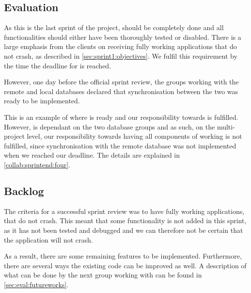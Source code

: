 \subsection{Evaluation}

As this is the last sprint of the project, \launcher should be completely done and all functionalities should either have been thoroughly tested or disabled.
There is a large emphasis from the clients on receiving  fully working applications that do not crash, as described in \cref{sec:sprint1:objectives}.
We fulfil this requirement by the time the deadline for \launcher is reached.

However, one day before the official sprint review, the groups working with the remote and local databases declared that synchronisation between the two was ready to be implemented.

This is an example of where \launcher is ready and our responsibility towards \launcher is fulfilled.
However, \launcher is dependant on the two database groups and as such, on the multi-project level, our responsibility towards having all components of \launcher working is not fulfilled, since synchronisation with the remote database was not implemented when we reached our deadline.
The details are explained in \cref{collab:sprintend:four}.\\

\subsection{Backlog}

The criteria for a successful sprint review was to have fully working applications, that do not crash.
This meant that some functionality is not added in this sprint, as it has not been tested and debugged and we can therefore not be certain that the application will not crash.

As a result, there are some remaining features to be implemented.
Furthermore, there are several ways the existing code can be improved as well.
A description of what can be done by the next group working with \launcher can be found in \cref{sec:eval:futureworks}.